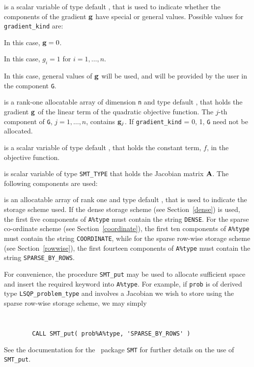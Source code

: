 \documentclass{galahad}
\newcommand{\packagename}{LSQP}
\begin{document}
\begin{description}
 is a scalar variable of type default \integer, 
that is used to indicate whether the components of the gradient ${\mathbf{g}}$ 
have special or general values. Possible values for {\tt gradient\_kind} are:
\begin{description}
  In this case, ${\mathbf{g}} = 0$.

 In this case, $g_{i} = 1$ for $i = 1, \ldots ,n$.

 In this case, general values of ${\mathbf{g}}$ will be used,
     and will be provided by the user in the component {\tt G}.
\end{description}

 is a rank-one allocatable array of dimension {\tt n} and type 
default \realdp, that holds the gradient ${\mathbf{g}}$ 
of the linear term of the quadratic objective function.
The $j$-th component of 
{\tt G}, $j = 1,  \ldots ,  n$, contains ${\mathbf{g}}_{j}$.
If {\tt gradient\_kind} {= 0, 1}, {\tt G} need not be allocated.

 is a scalar variable of type 
default \realdp, that holds 
the constant term, $f$, in the objective function.

 is scalar variable of type {\tt SMT\_TYPE} 
that holds the Jacobian matrix ${\mathbf{A}}$. The following components are used:

\begin{description}

 is an allocatable array of rank one and type default \character, that
is used to indicate the storage scheme used. If the dense storage scheme 
(see Section~\ref{dense}) is used, 
the first five components of {\tt A\%type} must contain the
string {\tt DENSE}.
For the sparse co-ordinate scheme (see Section~\ref{coordinate}), 
the first ten components of {\tt A\%type} must contain the
string {\tt COORDINATE}, while 
for the sparse row-wise storage scheme (see Section~\ref{rowwise}),
the first fourteen components of {\tt A\%type} must contain the
string {\tt SPARSE\_BY\_ROWS}.

For convenience, the procedure {\tt SMT\_put} 
may be used to allocate sufficient space and insert the required keyword
into {\tt A\%type}.
For example, if {\tt prob} is of derived type {\tt \packagename\_problem\_type}
and involves a Jacobian we wish to store using the sparse row-wise 
storage scheme, we may simply
{\tt 
\begin{verbatim}
        CALL SMT_put( prob%A%type, 'SPARSE_BY_ROWS' )
\end{verbatim}
}
\noindent
See the documentation for the \galahad\ package {\tt SMT} 
for further details on the use of {\tt SMT\_put}.


\end{description}
\end{description}
\end{document}
